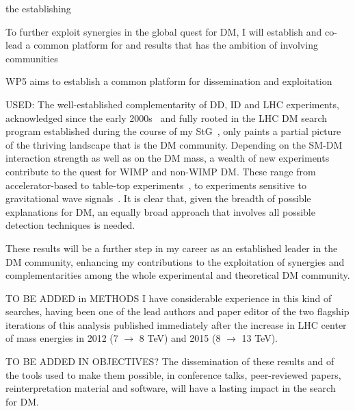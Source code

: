 
 the establishing  


To further exploit synergies in the global quest for DM, I will establish and co-lead a common platform for and results that has the ambition of involving  communities%

WP5 aims to establish a common platform for dissemination and exploitation 

USED:
The well-established complementarity of DD, ID and LHC experiments, acknowledged since the early 2000s~\cite{Snowmass} and fully rooted in the LHC DM search program established during the course of my StG~\cite{DMWG}, only paints a partial picture of the thriving landscape that is the DM community. 
Depending on the SM-DM interaction strength as well as on the DM mass, a wealth of new experiments contribute to the quest for WIMP and non-WIMP DM. These range from accelerator-based to table-top experiments~\cite{PBC}, to experiments sensitive to gravitational wave signals~\cite{BertoneGW,Cirelli}.  
It is clear that, given the breadth of possible explanations for DM, an equally broad approach that involves all possible detection techniques is needed.

These results will be a further step in my career as an established leader in the DM community, enhancing my contributions to the exploitation of synergies and complementarities among the whole experimental and theoretical DM community. 

TO BE ADDED in METHODS
I have considerable experience in this kind of searches, having been one of the lead authors and paper editor of the two flagship iterations of this analysis published immediately after the increase in LHC center of mass energies in 2012 (7 $\rightarrow$ 8 TeV) and 2015 (8 $\rightarrow$ 13 TeV). 




TO BE ADDED IN OBJECTIVES?
The dissemination of these results and of the tools used to make them possible, in conference talks, peer-reviewed papers, reinterpretation material and software, will have a lasting impact in the search for DM. 







